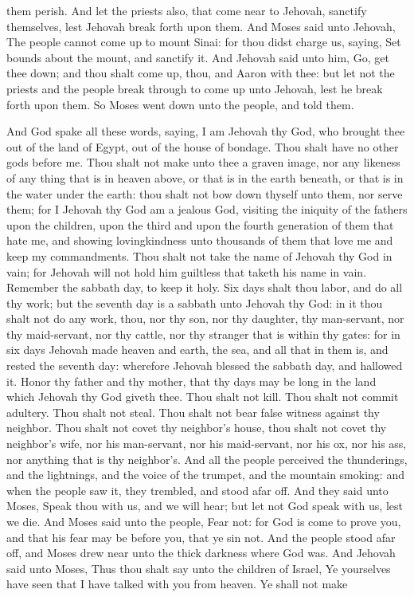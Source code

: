 them perish. And let the priests also, that come near to Jehovah, sanctify themselves, lest Jehovah break forth upon them. And Moses said unto Jehovah, The people cannot come up to mount Sinai: for thou didst charge us, saying, Set bounds about the mount, and sanctify it. And Jehovah said unto him, Go, get thee down; and thou shalt come up, thou, and Aaron with thee: but let not the priests and the people break through to come up unto Jehovah, lest he break forth upon them. So Moses went down unto the people, and told them. 

And God spake all these words, saying,  I am Jehovah thy God, who brought thee out of the land of Egypt, out of the house of bondage.  Thou shalt have no other gods before me.  Thou shalt not make unto thee a graven image, nor any likeness of any thing that is in heaven above, or that is in the earth beneath, or that is in the water under the earth: thou shalt not bow down thyself unto them, nor serve them; for I Jehovah thy God am a jealous God, visiting the iniquity of the fathers upon the children, upon the third and upon the fourth generation of them that hate me, and showing lovingkindness unto thousands of them that love me and keep my commandments.  Thou shalt not take the name of Jehovah thy God in vain; for Jehovah will not hold him guiltless that taketh his name in vain.  Remember the sabbath day, to keep it holy. Six days shalt thou labor, and do all thy work; but the seventh day is a sabbath unto Jehovah thy God: in it thou shalt not do any work, thou, nor thy son, nor thy daughter, thy man-servant, nor thy maid-servant, nor thy cattle, nor thy stranger that is within thy gates: for in six days Jehovah made heaven and earth, the sea, and all that in them is, and rested the seventh day: wherefore Jehovah blessed the sabbath day, and hallowed it.  Honor thy father and thy mother, that thy days may be long in the land which Jehovah thy God giveth thee.  Thou shalt not kill.  Thou shalt not commit adultery.  Thou shalt not steal.  Thou shalt not bear false witness against thy neighbor.  Thou shalt not covet thy neighbor’s house, thou shalt not covet thy neighbor’s wife, nor his man-servant, nor his maid-servant, nor his ox, nor his ass, nor anything that is thy neighbor’s.  And all the people perceived the thunderings, and the lightnings, and the voice of the trumpet, and the mountain smoking: and when the people saw it, they trembled, and stood afar off. And they said unto Moses, Speak thou with us, and we will hear; but let not God speak with us, lest we die. And Moses said unto the people, Fear not: for God is come to prove you, and that his fear may be before you, that ye sin not. And the people stood afar off, and Moses drew near unto the thick darkness where God was.  And Jehovah said unto Moses, Thus thou shalt say unto the children of Israel, Ye yourselves have seen that I have talked with you from heaven. Ye shall not make 